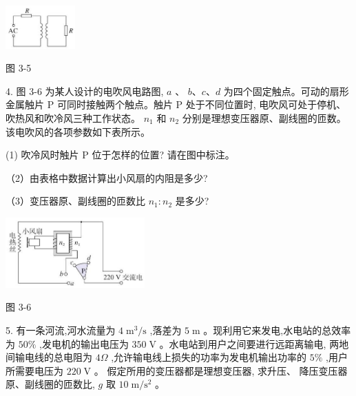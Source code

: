 \documentclass[10pt]{article}
\begin{document}
\begin{center}
\includegraphics[max width=0.2\textwidth]{images/01910e72-c5b7-7ed5-a6d4-fb3a5faefc32_74_650698.jpg}
\end{center}

图 3-5

4. 图 3-6 为某人设计的电吹风电路图, \(a\) 、 \(b\text{、}c\text{、}d\) 为四个固定触点。可动的扇形金属触片 \(\mathrm{P}\) 可同时接触两个触点。触片 \(\mathrm{P}\) 处于不同位置时, 电吹风可处于停机、吹热风和吹冷风三种工作状态。 \({n}_{1}\) 和 \({n}_{2}\) 分别是理想变压器原、副线圈的匝数。该电吹风的各项参数如下表所示。

\begin{center}
\end{center}

(1) 吹冷风时触片 \(\mathrm{P}\) 位于怎样的位置? 请在图中标注。

（2）由表格中数据计算出小风扇的内阻是多少?

（3）变压器原、副线圈的匝数比 \({n}_{1} : {n}_{2}\) 是多少?

\begin{center}
\includegraphics[max width=0.4\textwidth]{images/01910e72-c5b7-7ed5-a6d4-fb3a5faefc32_74_968788.jpg}
\end{center}

图 3-6

5. 有一条河流,河水流量为 \(4{\mathrm{\;m}}^{3}/\mathrm{s}\) ,落差为 \(5\mathrm{\;m}\) 。现利用它来发电,水电站的总效率为 \({50}\%\) ,发电机的输出电压为 \({350}\mathrm{\;V}\) 。水电站到用户之间要进行远距离输电, 两地间输电线的总电阻为 \({4\Omega }\) ,允许输电线上损失的功率为发电机输出功率的 \(5\%\) ,用户所需要电压为 \({220}\mathrm{\;V}\) 。 假定所用的变压器都是理想变压器, 求升压、 降压变压器原、副线圈的匝数比, \(g\) 取 \({10}\mathrm{\;m}/{\mathrm{s}}^{2}\) 。
\end{document}
